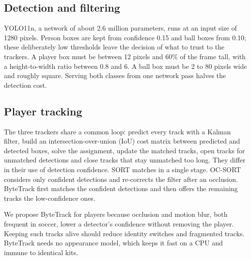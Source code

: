 \documentclass[conference]{IEEEtran}
\begin{document}
\subsection{Detection and filtering}
YOLO11n, a network of about 2.6 million parameters, runs at an input size of
1280 pixels. Person boxes are kept from confidence 0.15 and ball boxes from
0.10; these deliberately low thresholds leave the decision of what to trust to
the trackers. A player box must be between 12 pixels and 60\% of the frame
tall, with a height-to-width ratio between 0.8 and 6. A ball box must be 2 to 80
pixels wide and roughly square. Serving both classes from one network pass
halves the detection cost.

\subsection{Player tracking}
The three trackers share a common loop: predict every track with a Kalman
filter, build an intersection-over-union (IoU) cost matrix between predicted and
detected boxes, solve the assignment, update the matched tracks, open tracks
for unmatched detections and close tracks that stay unmatched too long. They
differ in their use of detection confidence. SORT matches in a single stage.
OC-SORT considers only confident detections and re-corrects the filter after an
occlusion. ByteTrack first matches the confident detections and then offers the
remaining tracks the low-confidence ones.

We propose ByteTrack for players because occlusion and motion blur, both
frequent in soccer, lower a detector's confidence without removing the player.
Keeping such tracks alive should reduce identity switches and fragmented tracks.
ByteTrack needs no appearance model, which keeps it fast on a CPU and immune to
identical kits.
\end{document}
